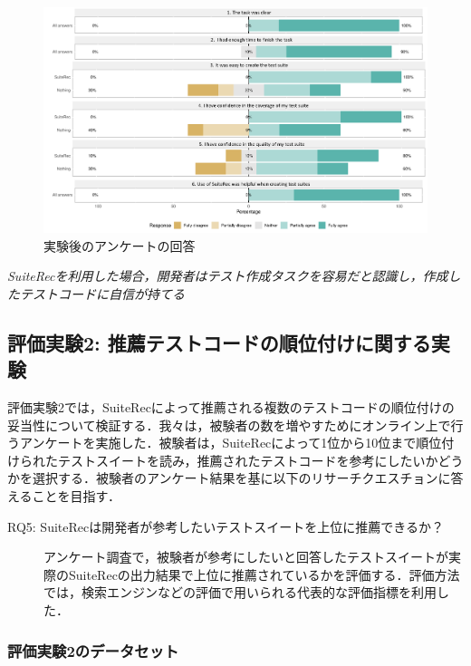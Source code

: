 \documentclass[12pt]{jarticle} %
\begin{document}
\begin{figure}[htbp]
  \begin{center}
   \includegraphics[width=15cm]{suiterec-expt.pdf}
  \caption{実験後のアンケートの回答}
  \label{QA}
  \end{center}
\end{figure}

\begin{breakbox}
\textit{{\sf SuiteRec}を利用した場合，開発者はテスト作成タスクを容易だと認識し，作成したテストコードに自信が持てる}
\end{breakbox}

\subsection{評価実験2: 推薦テストコードの順位付けに関する実験}
評価実験2では，{\sf SuiteRec}によって推薦される複数のテストコードの順位付けの妥当性について検証する．我々は，被験者の数を増やすためにオンライン上で行うアンケートを実施した．被験者は，{\sf SuiteRec}によって1位から10位まで順位付けられたテストスイートを読み，推薦されたテストコードを参考にしたいかどうかを選択する．被験者のアンケート結果を基に以下のリサーチクエスチョンに答えることを目指す．

\begin{description}
\item[RQ5: SuiteRecは開発者が参考したいテストスイートを上位に推薦できるか？]
アンケート調査で，被験者が参考にしたいと回答したテストスイートが実際の{\sf SuiteRec}の出力結果で上位に推薦されているかを評価する．評価方法では，検索エンジンなどの評価で用いられる代表的な評価指標を利用した．
\end{description}

\subsubsection{評価実験2のデータセット}
\end{document}
